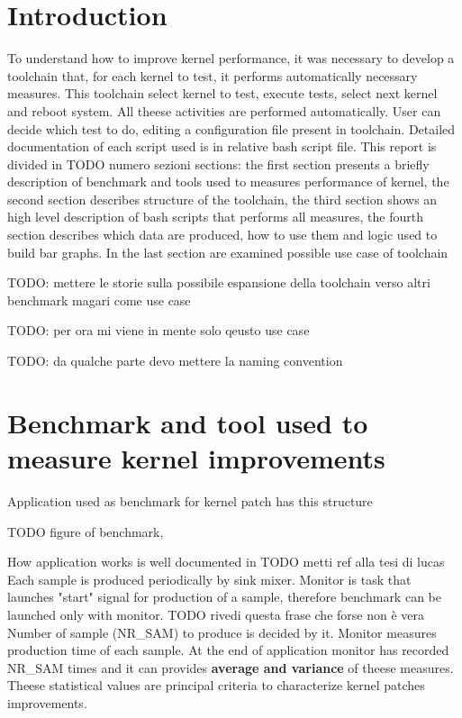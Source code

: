 \documentclass[a4paper,10pt]{article}
\begin{document}
\vspace{4ex}	%
\begin{multicols}{2}

\section{Introduction}

To understand how to improve kernel performance, it was necessary to develop a toolchain
that, for each kernel to test, it performs automatically necessary measures.
This toolchain select kernel to test, execute tests, select next kernel and reboot system.
All theese activities are performed automatically. User can decide which test to do, 
editing a configuration file present in toolchain. Detailed documentation of each script
used is in relative bash script file.
This report is divided in TODO numero sezioni sections: the first section presents a
briefly description of benchmark and tools used to measures performance of kernel, 
the second section describes structure of the toolchain,
the third section shows an high level description of bash scripts that performs
all measures, the fourth section describes which data are produced, how to use them
and logic used to build bar graphs. In the last section are examined possible use case
of toolchain

TODO: mettere le storie sulla possibile espansione della toolchain verso altri benchmark
magari come use case

TODO: per ora mi viene in mente solo qeusto use case

TODO: da qualche parte devo mettere la naming convention

\section{Benchmark and tool used to measure kernel improvements}

Application used as benchmark for kernel patch has this structure

TODO figure of benchmark, 

How application works is well documented in TODO metti ref alla tesi di lucas
Each sample is produced periodically by sink mixer. Monitor is task that launches "start"  
signal for production of a sample, therefore benchmark can be launched only with
monitor. TODO rivedi questa frase che forse non è vera 
Number of sample (NR\_SAM) to produce is decided by it. 
Monitor measures production time of each sample. At the end of application 
monitor has recorded NR\_SAM times and it can provides 
\textbf{ average and variance} of theese measures. 
Theese statistical values are principal criteria to characterize 
kernel patches improvements.


\end{multicols}
\end{document}
